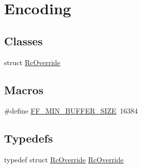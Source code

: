 \hypertarget{group__lavc__encoding}{}\section{Encoding}
\label{group__lavc__encoding}
\subsection*{Classes}
\begin{DoxyCompactItemize}
\item 
struct \hyperlink{struct_rc_override}{Rc\+Override}
\end{DoxyCompactItemize}
\subsection*{Macros}
\begin{DoxyCompactItemize}
\item 
\#define \hyperlink{group__lavc__encoding_gacf94eb890b3b77383ec7fd728db8509c}{F\+F\+\_\+\+M\+I\+N\+\_\+\+B\+U\+F\+F\+E\+R\+\_\+\+S\+I\+ZE}~16384
\end{DoxyCompactItemize}
\subsection*{Typedefs}
\begin{DoxyCompactItemize}
\item 
typedef struct \hyperlink{struct_rc_override}{Rc\+Override} \hyperlink{group__lavc__encoding_gab1f6225af3457c88da7b862af9873046}{Rc\+Override}
\end{DoxyCompactItemize}
